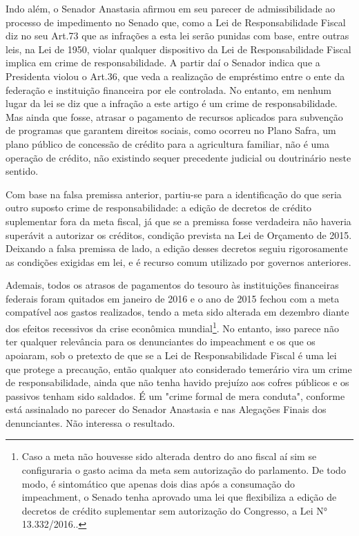 Indo além, o Senador Anastasia afirmou em seu parecer de admissibilidade
ao processo de impedimento no Senado que, como a Lei de Responsabilidade
Fiscal diz no seu Art.73 que as infrações a esta lei serão punidas com
base, entre outras leis, na Lei de 1950, violar qualquer dispositivo da
Lei de Responsabilidade Fiscal implica em crime de responsabilidade. A
partir daí o Senador indica que a Presidenta violou o Art.36, que veda a
realização de empréstimo entre o ente da federação e instituição
financeira por ele controlada. No entanto, em nenhum lugar da lei se diz
que a infração a este artigo é um crime de responsabilidade. Mas ainda
que fosse, atrasar o pagamento de recursos aplicados para subvenção de
programas que garantem direitos sociais, como ocorreu no Plano Safra, um
plano público de concessão de crédito para a agricultura familiar, não é
uma operação de crédito, não existindo sequer precedente judicial ou
doutrinário neste sentido.

Com base na falsa premissa anterior, partiu-se para a identificação do
que seria outro suposto crime de responsabilidade: a edição de decretos
de crédito suplementar fora da meta fiscal, já que se a premissa fosse
verdadeira não haveria superávit a autorizar os créditos, condição
prevista na Lei de Orçamento de 2015. Deixando a falsa premissa de lado,
a edição desses decretos seguiu rigorosamente as condições exigidas em
lei, e é recurso comum utilizado por governos anteriores.

Ademais, todos os atrasos de pagamentos do tesouro às instituições
financeiras federais foram quitados em janeiro de 2016 e o ano de 2015
fechou com a meta compatível aos gastos realizados, tendo a meta sido
alterada em dezembro diante dos efeitos recessivos da crise econômica
mundial\footnote{Caso a meta não houvesse sido alterada dentro do ano
  fiscal aí sim se configuraria o gasto acima da meta sem autorização do
  parlamento. De todo modo, é sintomático que apenas dois dias após a
  consumação do impeachment, o Senado tenha aprovado uma lei que
  flexibiliza a edição de decretos de crédito suplementar sem
  autorização do Congresso, a Lei N° 13.332/2016..}. No entanto, isso
parece não ter qualquer relevância para os denunciantes do impeachment e
os que os apoiaram, sob o pretexto de que se a Lei de Responsabilidade
Fiscal é uma lei que protege a precaução, então qualquer ato considerado
temerário vira um crime de responsabilidade, ainda que não tenha havido
prejuízo aos cofres públicos e os passivos tenham sido saldados. É um
"crime formal de mera conduta", conforme está assinalado no parecer do
Senador Anastasia e nas Alegações Finais dos denunciantes. Não interessa
o resultado.

